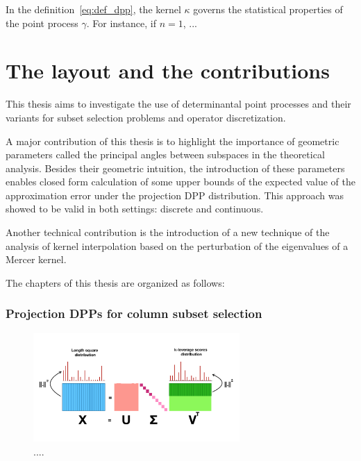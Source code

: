 \documentclass[twoside,11pt]{book}
\numberwithin{theorem}{chapter}
\numberwithin{definition}{chapter}
\numberwithin{proposition}{chapter}
\numberwithin{corollary}{chapter}
\numberwithin{example}{chapter}
\numberwithin{lemma}{chapter}
\numberwithin{assumption}{chapter}
\begin{document}
In the definition~\eqref{eq:def_dpp}, the kernel $\kappa$ governs the statistical properties of the point process $\gamma$. For instance, if $n =1$, ...


\clearpage



\section{The layout and the contributions}
This thesis aims to investigate the use of determinantal point processes and their variants for subset selection problems and operator discretization. 

A major contribution of this thesis is to highlight the importance of geometric parameters called the principal angles between subspaces in the theoretical analysis. Besides their geometric intuition, the introduction of these parameters enables closed form calculation of some upper bounds of the expected value of the approximation error under the projection DPP distribution. This approach was showed to be valid in both settings: discrete and continuous.

Another technical contribution is the introduction of a new technique of the analysis of kernel interpolation based on the perturbation of the eigenvalues of a Mercer kernel.



The chapters of this thesis are organized as follows:
\subsubsection{Projection DPPs for column subset selection}

\begin{figure}[h]
\centering
\includegraphics[width= 0.7\textwidth]{img/introduction/colorful_svd.png}
\caption{.... \label{fig:intro_colorful_svd}}
\end{figure}
\end{document}
